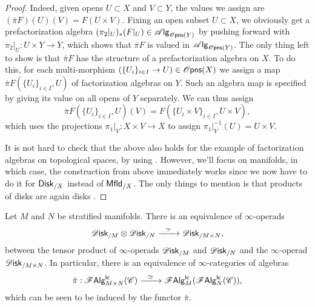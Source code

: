 \documentclass[../text.tex]{subfiles}
\begin{document}
\begin{proof}
    Indeed, given opens $U \subset X$ and $V \subset Y$, the values we assign are $(\bar{\pi}F) (U)(V) = F(U \times V)$. Fixing an open subset $U \subset X$, we obviously get a prefactorization algebra $(\pi_2|_U)_* (F|_U) \in \alg{\opens(Y)}$ by pushing forward with $\pi_2|_U: U \times Y \rightarrow Y$, which shows that $\bar{\pi}F$ is valued in $\alg{\opens(Y)}$. The only thing left to show is that $\bar{\pi} F$ has the structure of a prefactorization algebra on $X$. To do this, for each multi-morphism $(\{ U_i \}_{i \in I} \rightarrow U) \in \opens(X)$ we assign a map $\bar{\pi}F (\{ U_i \}_{i \in I}, U)$ of factorization algebras on $Y$. Such an algebra map is specified by giving its value on all opens of $Y$ separately. We can thus assign
    \begin{equation}
        \bar{\pi}F (\{ U_i \}_{i \in I}, U)(V) = F(\{ U_i \times V \}_{i \in I}, U \times V),
    \end{equation}
    which uses the projections $\pi_1|_V : X \times V \rightarrow X$ to assign $\pi_1|_V^{-1}(U) = U \times V$.

    It is not hard to check that the above also holds for the example of factorization algebras on topological spaces, by using \cite[\S7.2]{cg2016}. However, we'll focus on manifolds, in which case, the construction from above immediately works since we now have to do it for $\disk[r]_{/X}$ instead of $\mfld[r]_{/X}$. The only things to mention is that products of disks are again disks \cite[cor.3.4.9]{aft_localstrut}.
\end{proof}


\begin{theorem}[Additivity]\label{thm:exp_of_products_lc}
    Let $M$ and $N$ be stratified manifolds. There is an equivalence of $\infty$-operads
    \begin{equation}
        \disk_{/M} \otimes \disk_{/N} \xrightarrow{\ \ \simeq \ \ } \disk_{/M \times N},
    \end{equation}
    between the tensor product of $\infty$-operads $\disk_{/M}$ and $\disk_{/N}$ and the $\infty$-operad $\disk_{/M \times N}$. In particular, there is an equivalence of $\infty$-categories of algebras
    \begin{equation}
        \bar{\pi}: \mathscr{F} \mathsf{Alg}^{\mathsf{lc}}_{M \times N}(\mathscr{C}) \xrightarrow{\ \ \simeq \ \ } \mathscr{F} \mathsf{Alg}^{\mathsf{lc}}_{M}(\mathscr{F} \mathsf{Alg}^{\mathsf{lc}}_{N}(\mathscr{C})),
    \end{equation}
    which can be seen to be induced by the functor $\bar{\pi}$.
\end{theorem}
\end{document}
